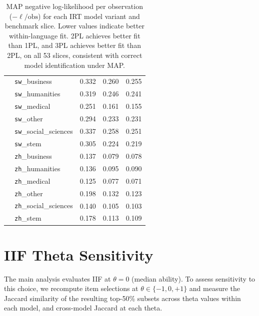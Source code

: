 \documentclass[11pt]{article}
\begin{document}
\begin{table}[t]
\begin{tabular}{llccc}
          & \texttt{sw}\_business        & 0.332 & 0.260 & 0.255 \\
          & \texttt{sw}\_humanities      & 0.319 & 0.246 & 0.241 \\
          & \texttt{sw}\_medical         & 0.251 & 0.161 & 0.155 \\
          & \texttt{sw}\_other           & 0.294 & 0.233 & 0.231 \\
          & \texttt{sw}\_social\_sciences & 0.337 & 0.258 & 0.251 \\
          & \texttt{sw}\_stem            & 0.305 & 0.224 & 0.219 \\
          & \texttt{zh}\_business        & 0.137 & 0.079 & 0.078 \\
          & \texttt{zh}\_humanities      & 0.136 & 0.095 & 0.090 \\
          & \texttt{zh}\_medical         & 0.125 & 0.077 & 0.071 \\
          & \texttt{zh}\_other           & 0.198 & 0.132 & 0.123 \\
          & \texttt{zh}\_social\_sciences & 0.140 & 0.105 & 0.103 \\
          & \texttt{zh}\_stem            & 0.178 & 0.113 & 0.109 \\
    \bottomrule
  \end{tabular}
  \caption{MAP negative log-likelihood per observation ($-\ell/\text{obs}$) for each
    IRT model variant and benchmark slice. Lower values indicate better within-language fit.
    2PL achieves better fit than 1PL, and 3PL achieves better fit than 2PL, on all 53 slices,
    consistent with correct model identification under MAP.}
  \label{tab:elbo_per_slice}
\end{table}

\section{IIF Theta Sensitivity}
\label{app:theta}

The main analysis evaluates IIF at $\theta = 0$ (median ability). To assess
sensitivity to this choice, we recompute item selections at $\theta \in \{-1,
0, +1\}$ and measure the Jaccard similarity of the resulting top-50\% subsets
across theta values within each model, and cross-model Jaccard at each theta.
\end{document}
